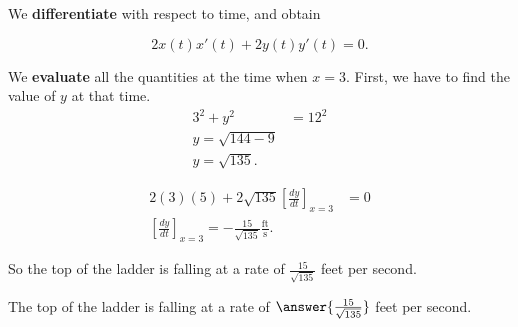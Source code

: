 \documentclass{ximera}
\begin{document}
\begin{exercise}
\begin{hint}
	We \textbf{differentiate} with respect to time, and obtain

\[
2x(t)x'(t)+2y(t)y'(t) = 0.
\]
\end{hint}

\begin{hint}
	We \textbf{evaluate} all the quantities  at the time when $x=3$. First, we have to find the value of $y$ at that time.
\begin{align*}
	3^2 +y^2 &= 12^2\\ 
	y = \sqrt{144-9}\\
	y = \sqrt{135}.
\end{align*}
\end{hint}

\begin{hint}
	 
\begin{align*}
2(3)(5)+2\sqrt{135}\left[\frac{dy}{dt}\right]_{x=3} &=0\\
\left[\frac{dy}{dt}\right]_{x=3} = -\frac{15}{\sqrt{135}}\frac{\textrm{ft}}{\textrm{s}}.
\end{align*}

So the top of the ladder is falling at  a rate of $\frac{15}{\sqrt{135}}$ feet per second.

\end{hint}

\begin{prompt}
	The top of the ladder is falling at a rate of $\answer{\frac{15}{\sqrt{135}}}$ feet per second.
\end{prompt}

\end{exercise}
\end{document}

